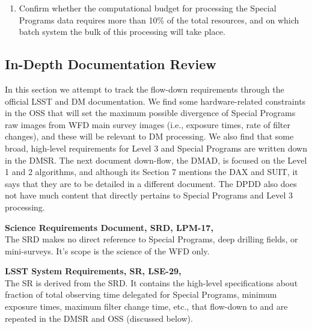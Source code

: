 \documentclass[DM,lsstdraft,toc]{lsstdoc}
\begin{document}
\begin{enumerate}[resume,topsep=-10pt,label= \textbf{Concern \Roman*.}] \item \label{C4} Confirm whether the computational budget for processing the Special Programs data requires more than 10\% of the total resources, and on which batch system the bulk of this processing will take place. \end{enumerate}



\subsection{In-Depth Documentation Review}\label{ssec:dmdocs_review}

In this section we attempt to track the flow-down requirements through the official LSST and DM documentation. We find some hardware-related constraints in the OSS that will set the maximum possible divergence of Special Programs raw images from WFD main survey images (i.e., exposure times, rate of filter changes), and these will be relevant to DM processing. We also find that some broad, high-level requirements for Level 3 and Special Programs are written down in the DMSR. The next document down-flow, the DMAD, is focused on the Level 1 and 2 algorithms, and although its Section 7 mentions the DAX and SUIT, it says that they are to be detailed in a different document. The DPDD also does not have much content that directly pertains to Special Programs and Level 3 processing.

\noindent \textbf{Science Requirements Document, SRD, LPM-17, \cite{LPM-17}}\\
The SRD makes no direct reference to Special Programs, deep drilling fields, or mini-surveys. It's scope is the science of the WFD only.

\noindent \textbf{LSST System Requirements, SR, LSE-29, \cite{LSE-29}}\\
The SR is derived from the SRD. It contains the high-level specifications about fraction of total observing time delegated for Special Programs, minimum exposure times, maximum filter change time, etc., that flow-down to and are repeated in the DMSR and OSS (discussed below).
\end{document}
